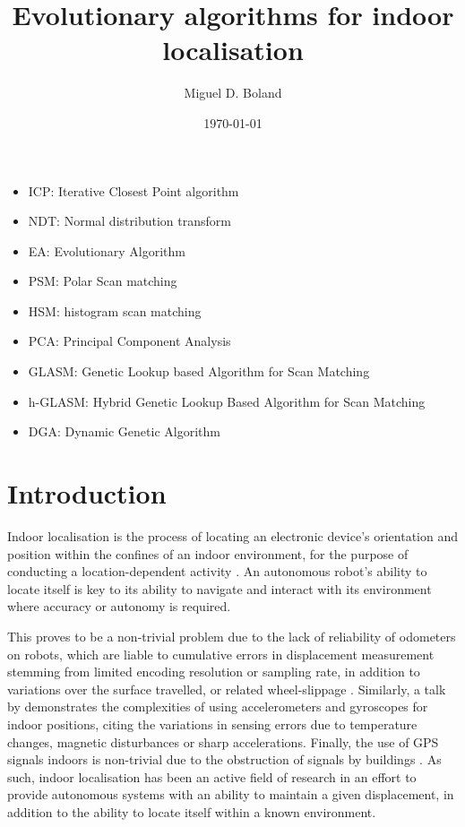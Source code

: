 \documentclass[authoryearcitations]{UoYCSproject}
\author{Miguel D. Boland}
\title{Evolutionary algorithms for indoor localisation}
\date{\today}
\begin{document}
\maketitle
\listoffigures
\listoftables
\clearpage
\lstlistoflistings
\begin{itemize}
	\item ICP: Iterative Closest Point algorithm
	\item NDT: Normal distribution transform
	\item EA: Evolutionary Algorithm
	\item PSM: Polar Scan matching
	\item HSM: histogram scan matching
	\item PCA: Principal Component Analysis
	\item GLASM: Genetic Lookup based Algorithm for Scan Matching
	\item h-GLASM: Hybrid Genetic Lookup Based Algorithm for Scan Matching
	\item DGA: Dynamic Genetic Algorithm
\end{itemize}


\chapter{Introduction}
\label{cha:Introduction}
Indoor localisation is the process of locating an electronic device's orientation and position within the confines of an indoor environment, for the purpose of conducting a location-dependent activity \cite{Curran2011-zs}. An autonomous robot's ability to locate itself is key to its ability to navigate and interact with its environment where accuracy or autonomy is required.
\newline

This proves to be a non-trivial problem due to the lack of reliability of odometers on robots, which are liable to cumulative errors in displacement measurement stemming from limited encoding resolution or sampling rate, in addition to variations over the surface travelled, or related wheel-slippage \cite{Borenstein1996-al}. Similarly, a talk by \citet{Sachs2010-pw} demonstrates the complexities of using accelerometers and gyroscopes for indoor positions, citing the variations in sensing errors due to temperature changes, magnetic disturbances or sharp accelerations. Finally, the use of GPS signals indoors is non-trivial due to the obstruction of signals by buildings \cite{Gowdayyanadoddi2015-hg}. As such, indoor localisation has been an active field of research in an effort to provide autonomous systems with an ability to maintain a given displacement, in addition to the ability to locate itself within a known environment. 
\newline
\end{document}
